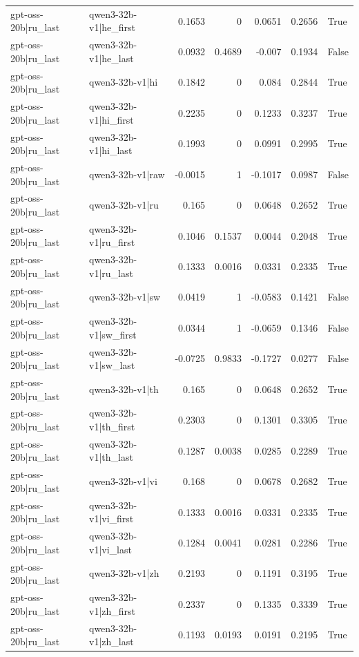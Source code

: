 \begin{table}
\begin{tabular}{l l r r r r l}
gpt-oss-20b|ru_last & qwen3-32b-v1|he_first & 0.1653 & 0 & 0.0651 & 0.2656 & True \\
gpt-oss-20b|ru_last & qwen3-32b-v1|he_last & 0.0932 & 0.4689 & -0.007 & 0.1934 & False \\
gpt-oss-20b|ru_last & qwen3-32b-v1|hi & 0.1842 & 0 & 0.084 & 0.2844 & True \\
gpt-oss-20b|ru_last & qwen3-32b-v1|hi_first & 0.2235 & 0 & 0.1233 & 0.3237 & True \\
gpt-oss-20b|ru_last & qwen3-32b-v1|hi_last & 0.1993 & 0 & 0.0991 & 0.2995 & True \\
gpt-oss-20b|ru_last & qwen3-32b-v1|raw & -0.0015 & 1 & -0.1017 & 0.0987 & False \\
gpt-oss-20b|ru_last & qwen3-32b-v1|ru & 0.165 & 0 & 0.0648 & 0.2652 & True \\
gpt-oss-20b|ru_last & qwen3-32b-v1|ru_first & 0.1046 & 0.1537 & 0.0044 & 0.2048 & True \\
gpt-oss-20b|ru_last & qwen3-32b-v1|ru_last & 0.1333 & 0.0016 & 0.0331 & 0.2335 & True \\
gpt-oss-20b|ru_last & qwen3-32b-v1|sw & 0.0419 & 1 & -0.0583 & 0.1421 & False \\
gpt-oss-20b|ru_last & qwen3-32b-v1|sw_first & 0.0344 & 1 & -0.0659 & 0.1346 & False \\
gpt-oss-20b|ru_last & qwen3-32b-v1|sw_last & -0.0725 & 0.9833 & -0.1727 & 0.0277 & False \\
gpt-oss-20b|ru_last & qwen3-32b-v1|th & 0.165 & 0 & 0.0648 & 0.2652 & True \\
gpt-oss-20b|ru_last & qwen3-32b-v1|th_first & 0.2303 & 0 & 0.1301 & 0.3305 & True \\
gpt-oss-20b|ru_last & qwen3-32b-v1|th_last & 0.1287 & 0.0038 & 0.0285 & 0.2289 & True \\
gpt-oss-20b|ru_last & qwen3-32b-v1|vi & 0.168 & 0 & 0.0678 & 0.2682 & True \\
gpt-oss-20b|ru_last & qwen3-32b-v1|vi_first & 0.1333 & 0.0016 & 0.0331 & 0.2335 & True \\
gpt-oss-20b|ru_last & qwen3-32b-v1|vi_last & 0.1284 & 0.0041 & 0.0281 & 0.2286 & True \\
gpt-oss-20b|ru_last & qwen3-32b-v1|zh & 0.2193 & 0 & 0.1191 & 0.3195 & True \\
gpt-oss-20b|ru_last & qwen3-32b-v1|zh_first & 0.2337 & 0 & 0.1335 & 0.3339 & True \\
gpt-oss-20b|ru_last & qwen3-32b-v1|zh_last & 0.1193 & 0.0193 & 0.0191 & 0.2195 & True \\

\end{tabular}
\end{table}
